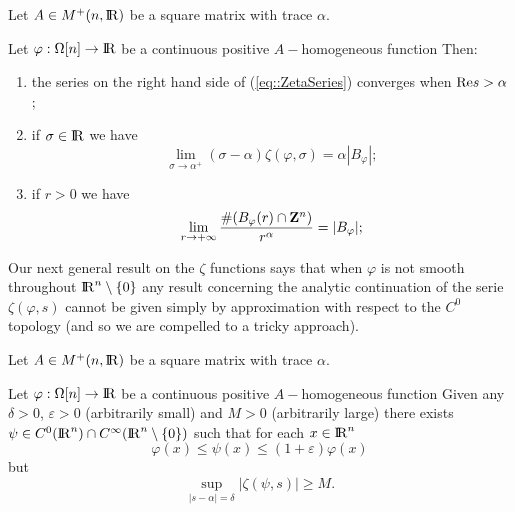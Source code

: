 \documentclass[12pt,a4paper]{amsart}
\begin{document}
\begin{theorem}\label{thm::Zetalim}
Let ${A}\in{{{M}^+}({n},{{\rm I\kern-.185em R}})}$ be a square matrix
with trace ${\alpha}$.

Let ${\varphi}:{\Omega}[{n}]\to{{\rm I\kern-.185em R}}$ be a continuous
positive ${A}-$homogeneous function
Then:
\begin{enumerate}
	\item the series on the right hand side of (\ref{eq::ZetaSeries})
		converges when ${\mathop{\rm Re}\nolimits}{s}>{\alpha}$;
	\item if $\sigma\in{{\rm I\kern-.185em R}}$ we have
\begin{equation}\nonumber
	\lim_{\sigma\to{\alpha}^+}
		(\sigma-{\alpha}){\zeta}({\varphi},\sigma)
	={\alpha}|{B}_{\varphi}|;
\end{equation}
	\item if ${r}>0$ we have
\begin{equation}\nonumber
	\lim_{{r}\to+\infty}
		\frac{\#({B}_{\varphi}({r})\cap{{\bf Z}}^{n})}{{r}^{\alpha}}
	=|{B}_{\varphi}|;
\end{equation}
\end{enumerate}
\end{theorem}

Our next general result on the ${\zeta}$ functions
says that when ${\varphi}$ is not smooth throughout
${{\rm I\kern-.185em R}}^{n}\setminus\{0\}$ any result concerning the analytic continuation
of the serie ${\zeta}({\varphi},{s})$ cannot be given
simply by approximation with respect to the $C^0$ topology
(and so we are compelled to a tricky approach).

\begin{theorem}\label{thm::ZetaDiscontinuous}
Let ${A}\in{{{M}^+}({n},{{\rm I\kern-.185em R}})}$ be a square matrix
with trace ${\alpha}$.

Let ${\varphi}:{\Omega}[{n}]\to{{\rm I\kern-.185em R}}$ be a continuous
positive ${A}-$homogeneous function
Given any ${\delta}>0$, ${\varepsilon}>0$ (arbitrarily small)
and ${M}>0$ (arbitrarily large) there exists
${\psi}\in C^0({{\rm I\kern-.185em R}}^{n})\cap C^{\infty}({{\rm I\kern-.185em R}}^{n}\setminus\{0\})$
such that for each ${x}\in{{\rm I\kern-.185em R}}^{n}$
\begin{equation}\nonumber
	{\varphi}({x})\leq{\psi}({x})\leq(1+\varepsilon){\varphi}({x})
\end{equation}
but
\begin{equation}\nonumber
	\sup_{|{s}-{\alpha}|=\delta}
	\left|{\zeta}({\psi},{s})\right|\geq{M}.
\end{equation}
\end{theorem}
\end{document}
